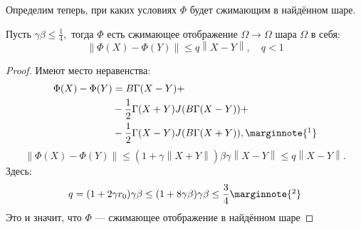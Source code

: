 Определим теперь, при каких условиях \( \Phi \) будет сжимающим в найдённом шаре.
\begin{lemma}
    Пусть \( \gamma\beta \leq \frac14, \)
    тогда \( \Phi \) есть сжимающее отображение \(\Omega\to\Omega\) шара \(\Omega\) в себя:
    \[ {\left\|\Phi(X)-\Phi(Y)\right\|} \leq q {\left\|X-Y\right\|}, \quad q<1\]
\end{lemma}
\begin{proof}
    Имеют место неравенства:
    \begin{align*}
        \Phi(X) - \Phi(Y) &= B\Gamma (X-Y) + \\
        &- \frac12 \Gamma (X + Y)J(B\Gamma(X - Y)) + \\
        &- \frac12 \Gamma (X - Y)J(B\Gamma(X + Y)),
        \marginnote{\footnotemark}
    \end{align*}
    \[
        {\left\|\Phi(X) - \Phi(Y)\right\|} \leq (1 + \gamma{\left\|X+Y\right\|})\beta\gamma {\left\|X-Y\right\|} \leq q{\left\|X-Y\right\|}.
        \]
    Здесь:
    \begin{equation}\label{eq:lipconst}
        q = (1+2\gamma r_0)\gamma\beta
        \leq (1+8\gamma\beta)\gamma\beta \leq \frac{3}{4}
        \marginnote{\footnotemark}
    \end{equation}
    Это и значит, что \( \Phi \) --- сжимающее отображение в найдённом шаре
\end{proof}

